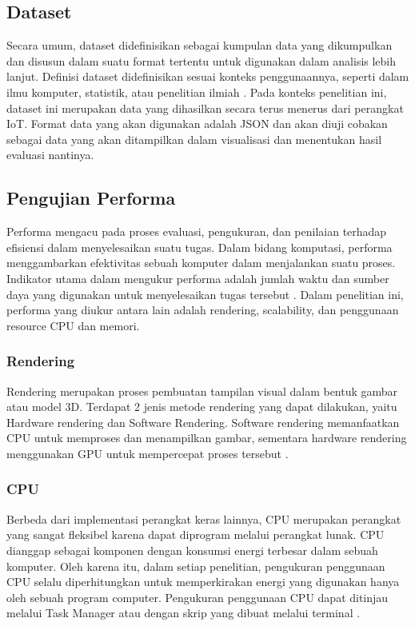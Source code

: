 \subsection{Dataset}
Secara umum, dataset didefinisikan sebagai kumpulan data yang dikumpulkan dan disusun dalam suatu format tertentu untuk digunakan dalam analisis lebih lanjut. Definisi dataset didefinisikan sesuai konteks penggunaannya, seperti dalam ilmu komputer, statistik, atau penelitian ilmiah \cite{Renear2010}. Pada konteks penelitian ini, dataset ini merupakan data yang dihasilkan secara terus menerus dari perangkat IoT. Format data yang akan digunakan adalah JSON dan akan diuji cobakan sebagai data yang akan ditampilkan dalam visualisasi dan menentukan hasil evaluasi nantinya. 

\subsection{Pengujian Performa}
Performa mengacu pada proses evaluasi, pengukuran, dan penilaian terhadap efisiensi dalam menyelesaikan suatu tugas. Dalam bidang komputasi, performa menggambarkan efektivitas sebuah komputer dalam menjalankan suatu proses. Indikator utama dalam mengukur performa adalah jumlah waktu dan sumber daya yang digunakan untuk menyelesaikan tugas tersebut \cite{EggerLampl2012}. Dalam penelitian ini, performa yang diukur antara lain adalah rendering, scalability, dan penggunaan resource CPU dan memori. 

\subsubsection{Rendering}
Rendering merupakan proses pembuatan tampilan visual dalam bentuk gambar atau model 3D. Terdapat 2 jenis metode rendering yang dapat dilakukan, yaitu Hardware rendering dan Software Rendering. Software rendering memanfaatkan CPU untuk memproses dan menampilkan gambar, sementara hardware rendering menggunakan GPU untuk mempercepat proses tersebut \cite{Paradis2016}.

\subsubsection{CPU}
Berbeda dari implementasi perangkat keras lainnya, CPU merupakan perangkat yang sangat fleksibel karena dapat diprogram melalui perangkat lunak. CPU dianggap sebagai komponen dengan konsumsi energi terbesar dalam sebuah komputer. Oleh karena itu, dalam setiap penelitian, pengukuran penggunaan CPU selalu diperhitungkan untuk memperkirakan energi yang digunakan hanya oleh sebuah program computer. Pengukuran penggunaan CPU dapat ditinjau melalui Task Manager atau dengan skrip yang dibuat melalui terminal \cite{8566475}.

